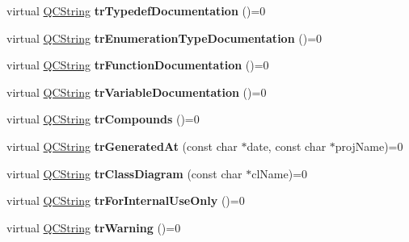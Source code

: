 \begin{DoxyCompactItemize}
\item 
\mbox{\label{class_translator_a74a96db24fcfdcaea9988b7ffff60271}} 
virtual \mbox{\hyperlink{class_q_c_string}{Q\+C\+String}} {\bfseries tr\+Typedef\+Documentation} ()=0
\item 
\mbox{\label{class_translator_a688c81619f410644c0fb5b3e7d96b4d6}} 
virtual \mbox{\hyperlink{class_q_c_string}{Q\+C\+String}} {\bfseries tr\+Enumeration\+Type\+Documentation} ()=0
\item 
\mbox{\label{class_translator_a3733d3cbf05292e37f9c6503e92e30ff}} 
virtual \mbox{\hyperlink{class_q_c_string}{Q\+C\+String}} {\bfseries tr\+Function\+Documentation} ()=0
\item 
\mbox{\label{class_translator_a637b04555eedd43402fe240760f302ea}} 
virtual \mbox{\hyperlink{class_q_c_string}{Q\+C\+String}} {\bfseries tr\+Variable\+Documentation} ()=0
\item 
\mbox{\label{class_translator_a8e2b65d58a4997060ee9f2feff75046b}} 
virtual \mbox{\hyperlink{class_q_c_string}{Q\+C\+String}} {\bfseries tr\+Compounds} ()=0
\item 
\mbox{\label{class_translator_a256d8f2585b2b29a785ea217568778d2}} 
virtual \mbox{\hyperlink{class_q_c_string}{Q\+C\+String}} {\bfseries tr\+Generated\+At} (const char $\ast$date, const char $\ast$proj\+Name)=0
\item 
\mbox{\label{class_translator_ab48ba6edf52f116adc4ecb47314470a4}} 
virtual \mbox{\hyperlink{class_q_c_string}{Q\+C\+String}} {\bfseries tr\+Class\+Diagram} (const char $\ast$cl\+Name)=0
\item 
\mbox{\label{class_translator_af3a9c3c5d0e47b4b9984b02dea4d6f63}} 
virtual \mbox{\hyperlink{class_q_c_string}{Q\+C\+String}} {\bfseries tr\+For\+Internal\+Use\+Only} ()=0
\item 
\mbox{\label{class_translator_ad00b8ff1d576631ed24b1aaf81f21b82}} 
virtual \mbox{\hyperlink{class_q_c_string}{Q\+C\+String}} {\bfseries tr\+Warning} ()=0
\item 

\end{DoxyCompactItemize}
